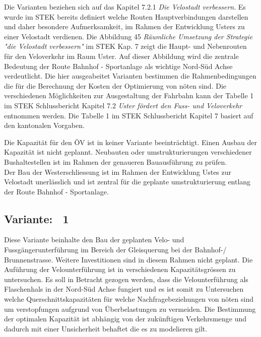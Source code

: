%
%
%
%


Die Varianten beziehen sich auf das Kapitel 7.2.1 \textit{Die Velostadt verbessern}. Es wurde im STEK bereits definiert welche Routen Hauptverbindungen darstellen und daher besondere Aufmerksamkeit, im Rahmen der Entwicklung Usters zu einer Velostadt verdienen.
Die Abbildung 45 \textit{Räumliche Umsetzung der Strategie "die Velostadt verbessern"} im STEK Kap. 7 zeigt die Haupt- und Nebenrouten für den Veloverkehr im Raum Uster.
Auf dieser Abbildung wird die zentrale Bedeutung der Route Bahnhof - Sportanlage als wichtige Nord-Süd Achse verdeutlicht.
Die hier ausgeabeitet Varianten bestimmen die Rahmenbedingungen die für die Berechnung der Kosten der Optimierung von nöten sind. 
Die verschiedenen Möglichkeiten zur Ausgestaltung der Fahrbahn kann der Tabelle 1 im STEK Schlussbericht Kapitel 7.2 \textit{Uster fördert den Fuss- und Veloverkehr} entnommen werden.  
Die Tabelle 1 im STEK Schlussbericht Kapitel 7 basiert auf den kantonalen Vorgaben. 

Die Kapazität für den ÖV ist in keiner Variante beeinträchtigt. Einen Ausbau der Kapazität ist nicht geplannt. Neubauten oder umstrukturierungen verschiedener Bushaltestellen ist im Rahmen der genaueren Bauausführung zu prüfen. \\
Der Bau der Westerschliessung ist im Rahmen der Entwicklung Ustes zur Velostadt unerlässlich und ist zentral für die geplante umstrukturierung entlang der Route Bahnhof - Sportanlage.

\subsection{Variante: \ 1}
\label{subsec:V1}
	
Diese Variante beinhalte den Bau der geplanten Velo- und Fussgängerunterführung im Bereich der Gleisquerung bei der Bahnhof-/ Brunnenstrasse. Weitere Investitionen sind in diesem Rahmen nicht geplant. Die Auführung der Velounterführung ist in verschiedenen Kapazitätsgrössen zu untersuchen. Es soll in Betracht gezogen werden, dass die Velounterführung als Flaschenhals in der Nord-Süd Achse fungiert und es ist somit zu Untersuchen welche Querschnittskapazitäten für welche Nachfragebeziehungen von nöten sind um verstopfungen aufgrund von Überbelastungen zu vermeiden. Die Bestimmung der optimalen Kapazität ist abhängig von der zukünftigen Verkehrsmenge und dadurch mit einer Unsicherheit behaftet die es zu modelieren gilt. 

